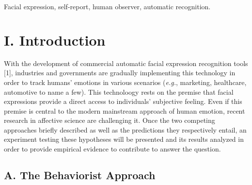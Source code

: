 \documentclass[conference,final,]{IEEEtran}
\begin{document}




\maketitle


%
\IEEEpeerreviewmaketitle


\begin{IEEEkeywords}
Facial expression, self-report, human observer, automatic recognition.
\end{IEEEkeywords}

\hypertarget{i.-introduction}{%
\section{I. Introduction}\label{i.-introduction}}

With the development of commercial automatic facial expression
recognition tools {[}1{]}, industries and governments are gradually
implementing this technology in order to track humans' emotions in
various scenarios (\emph{e.g.}, marketing, healthcare, automotive to
name a few). This technoloogy rests on the premise that facial
expressions provide a direct access to individuals' subjective feeling.
Even if this premise is central to the modern mainstream approach of
human emotion, recent research in affective science are challenging it.
Once the two competing approaches briefly described as well as the
predictions they respectively entail, an experiment testing these
hypotheses will be presented and its results analyzed in order to
provide empirical evidence to contribute to answer the question.

\hypertarget{a.-the-behaviorist-approach}{%
\subsection{A. The Behaviorist
Approach}\label{a.-the-behaviorist-approach}}
\end{document}
